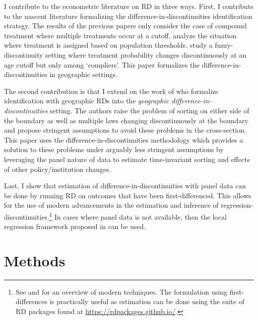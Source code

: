\documentclass[12pt]{article}
\begin{document}
I contribute to the econometric literature on RD in three ways. First, I contribute to the nascent literature formalizing the difference-in-discontinuities identification strategy. The results of the previous papers only consider the case of compound treatment where multiple treatments occur at a cutoff. \citet{Grembi_Nannicini_Troiano_2016, Eggers_Freier_Grembi_Nannicini_2018} analyze the situation where treatment is assigned based on population thresholds. \citet{Galindo-Silva_Some_Tchuente_2021,Millan-Quijano_2020} study a fuzzy-discontinuity setting where treatment probability changes discontinuously at an age cutoff but only among `compliers'. This paper formalizes the difference-in-discontinuities in geographic settings.

The second contribution is that I extend on the work of \citet{Keele_Titiunik_2015} who formalize identification with geographic RDs into the \emph{geographic difference-in-discontinuities} setting. The authors raise the problem of sorting on either side of the boundary as well as multiple laws changing discontinuously at the boundary and propose stringent assumptions to avoid these problems in the cross-section. This paper uses the  difference-in-discontinuities methodology which provides a solution to these problems under arguably less stringent assumptions by leveraging the panel nature of data to estimate time-invariant sorting and effects of other policy/institution changes.

Last, I show that estimation of difference-in-discontinuities with panel data can be done by running RD on outcomes that have been first-differenced. This allows for the use of modern advancements in the estimation and inference of regression-discontinuities.\footnote{See \citet{Cattaneo_Idrobo_Titiunik_2019} and \citet{Cattaneo_Idrobo_Titiunik_2020} for an overview of modern techniques. The formulation using first-differences is practically useful as estimation can be done using the suite of RD packages found at \href{https://rdpackages.github.io/}{{https://rdpackages.github.io/}}.} In cases where panel data is not available, then the local regression framework proposed in \citet{Grembi_Nannicini_Troiano_2016} can be used.

\section{Methods}
\end{document}
